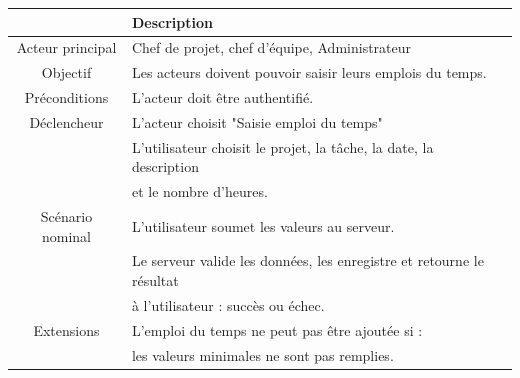 \begin{center}
\begin{tabular}{|c|l|}
\hline 
&\textbf { Description }\\\hline 
    Acteur principal & Chef de projet, chef d’équipe, Administrateur \\\hline 
    Objectif&Les acteurs doivent pouvoir saisir leurs emplois du temps.\\\hline
    Préconditions&L’acteur doit être authentifié.  \\\hline 
    Déclencheur&L’acteur choisit "Saisie emploi du temps"\\\hline 
    &L’utilisateur choisit le projet, la tâche, la date, la description       \\
    &et le nombre d’heures.     \\
    Scénario nominal&L’utilisateur soumet les valeurs au serveur.   \\
    &Le serveur valide les données, les enregistre et retourne le résultat    \\
    & à l’utilisateur : succès ou échec.   \\
    \hline
    Extensions&  L'emploi du temps ne peut pas être ajoutée si : \\&les valeurs minimales ne sont pas remplies.\\\hline
\end{tabular}
\label{desc_emp_temps}
\end{center}

